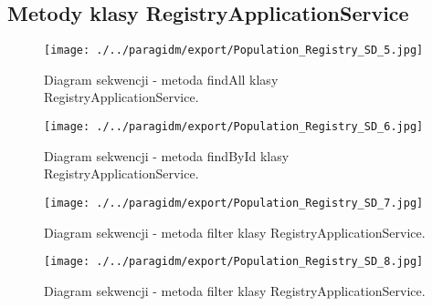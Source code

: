 \documentclass[12pt]{article}
\begin{document}
\clearpage
\subsection{Metody klasy RegistryApplicationService}
\begin{figure}[H]
    \centering
    \texttt{[image: ./../paragidm/export/Population\_Registry\_SD\_5.jpg]}
    \caption{Diagram sekwencji - metoda findAll klasy RegistryApplicationService.}
    \label{}
\end{figure}


\begin{figure}[H]
    \centering
    \texttt{[image: ./../paragidm/export/Population\_Registry\_SD\_6.jpg]}
    \caption{Diagram sekwencji - metoda findById klasy RegistryApplicationService.}
    \label{}
\end{figure}


\begin{figure}[H]
    \centering
    \texttt{[image: ./../paragidm/export/Population\_Registry\_SD\_7.jpg]}
    \caption{Diagram sekwencji - metoda filter klasy RegistryApplicationService.}
    \label{}
\end{figure}


\begin{figure}[H]
    \centering
    \texttt{[image: ./../paragidm/export/Population\_Registry\_SD\_8.jpg]}
    \caption{Diagram sekwencji - metoda filter klasy RegistryApplicationService.}
    \label{}
\end{figure}

\end{document}
